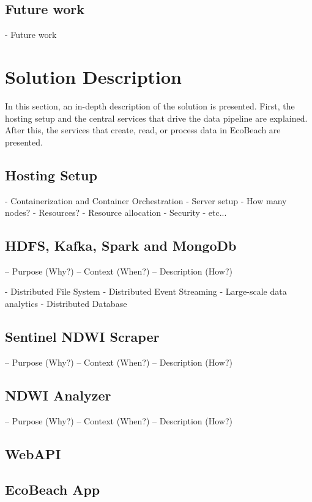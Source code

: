 \subsection{Future work}
- Future work

\section{Solution Description}

In this section, an in-depth description of the solution is presented.  First, the hosting setup and the central services that drive the data pipeline are explained. After this, the services that create, read, or process data in EcoBeach are presented.

\subsection{Hosting Setup}

- Containerization and Container Orchestration
- Server setup
    - How many nodes?
    - Resources?
    - Resource allocation
    - Security
    - etc...

\subsection{HDFS, Kafka, Spark and MongoDb}

– Purpose (Why?)
– Context (When?)
– Description (How?)

- Distributed File System
- Distributed Event Streaming
- Large-scale data analytics
- Distributed Database

\subsection{Sentinel NDWI Scraper}

– Purpose (Why?)
– Context (When?)
– Description (How?)

\subsection{NDWI Analyzer}

– Purpose (Why?)
– Context (When?)
– Description (How?)

\subsection{WebAPI}

\subsection{EcoBeach App}





